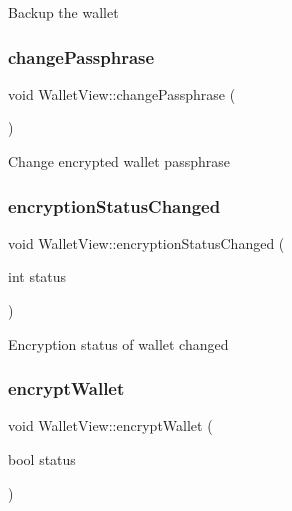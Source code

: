 Backup the wallet \mbox{\label{class_wallet_view_a36699c31e256becb2afd92f834830ba0}} 
\subsubsection{\texorpdfstring{change\+Passphrase}{changePassphrase}}
{\footnotesize\ttfamily void Wallet\+View\+::change\+Passphrase (\begin{DoxyParamCaption}{ }\end{DoxyParamCaption})\hspace{0.3cm}{\ttfamily [slot]}}

Change encrypted wallet passphrase \mbox{\label{class_wallet_view_a98ed22bbde34c1e614e60ecd0b07f03b}} 
\subsubsection{\texorpdfstring{encryption\+Status\+Changed}{encryptionStatusChanged}}
{\footnotesize\ttfamily void Wallet\+View\+::encryption\+Status\+Changed (\begin{DoxyParamCaption}\item[{int}]{status }\end{DoxyParamCaption})\hspace{0.3cm}{\ttfamily [signal]}}

Encryption status of wallet changed \mbox{\label{class_wallet_view_a164c3de8fc69ef6f39fb7c15e4bda553}} 
\subsubsection{\texorpdfstring{encrypt\+Wallet}{encryptWallet}}
{\footnotesize\ttfamily void Wallet\+View\+::encrypt\+Wallet (\begin{DoxyParamCaption}\item[{bool}]{status }\end{DoxyParamCaption})\hspace{0.3cm}{\ttfamily [slot]}}

